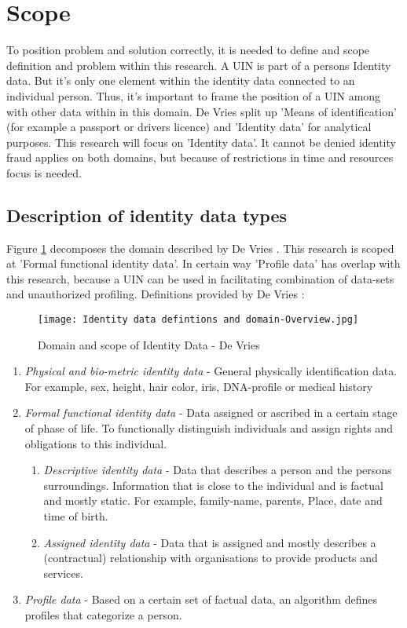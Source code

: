 \section{Scope}
To position problem and solution correctly, it is needed to define and scope definition and problem within this research. A UIN is part of a persons Identity data. But it's only one element within the identity data connected to an individual person. Thus, it's important to frame the position of a UIN among with other data within in this domain.
De Vries \etal \cite{Vries2007IdentiteitsfraudeEA} split up 'Means of identification' (for example a passport or drivers licence) and 'Identity data' for analytical purposes. This research will focus on 'Identity data'. It cannot be denied identity fraud applies on both domains, but because of restrictions in time and resources focus is needed. 

\subsection{Description of identity data types} \label{Identity_datatypes}
Figure \ref{fig:ID_domain} decomposes the domain described by De Vries \etal. This research is scoped at 'Formal functional identity data'. In certain way 'Profile data' has overlap with this research, because a UIN can be used in facilitating combination of data-sets and unauthorized profiling. Definitions provided by De Vries \etal: 
\graphicspath{ {./images/} }
\begin{figure}
\texttt{[image: Identity data defintions and domain-Overview.jpg]}\\
\caption{Domain and scope of Identity Data - De Vries \etal \cite{Vries2007IdentiteitsfraudeEA}}
\label{fig:ID_domain}
\end{figure}
\begin{enumerate}
\item \textit{Physical and bio-metric identity data} - General physically identification data. For example, sex, height, hair color, iris, DNA-profile or medical history
\item \textit{Formal functional identity data} - Data assigned or ascribed in a certain stage of phase of life. To functionally distinguish individuals and assign rights and obligations to this individual.
\begin{enumerate}
\item \textit{Descriptive identity data} - Data that describes a person and the persons surroundings. Information that is close to the individual and is factual and mostly static. For example, family-name, parents, Place, date and time of birth. 
\item \textit{Assigned identity data} - Data that is assigned and mostly describes a (contractual) relationship with organisations to provide products and services.
\end{enumerate}
\item \textit{Profile data} - Based on a certain set of factual data, an algorithm defines profiles that categorize a person. 
\end{enumerate}


